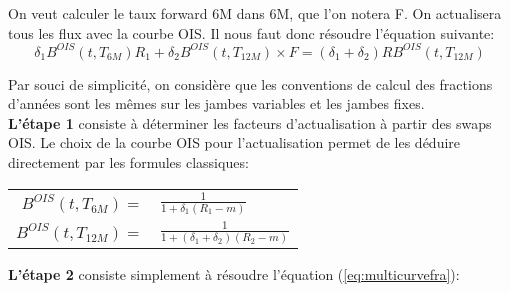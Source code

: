 \documentclass{article}
\begin{document}
On veut calculer le taux forward 6M dans 6M, que l'on notera F. On actualisera tous les flux avec la courbe OIS. Il nous faut donc résoudre l'équation suivante:\\
\begin{equation}
\label{eq:multicurvefra}
\delta_1 B^{OIS}(t,T_{6M}) R_1 + \delta_2 B^{OIS}(t,T_{12M}) \times F = (\delta_1 + \delta_2) R B^{OIS}(t,T_{12M})
\end{equation}

Par souci de simplicité, on considère que les conventions de calcul des fractions d'années sont les mêmes sur les jambes variables et les jambes fixes.\\

\textbf{L'étape 1} consiste à déterminer les facteurs d'actualisation à partir des swaps OIS. Le choix de la courbe OIS pour l'actualisation permet de les déduire directement par les formules classiques: 

\begin{center}
\begin{tabular}{r l}
$B^{OIS}(t,T_{6M})=$ & $\frac{1}{1+\delta_1 (R_1-m)}$ \\
$B^{OIS}(t,T_{12M})=$ & $\frac{1}{1+(\delta_1 + \delta_2) (R_2-m)}$ \\
\end{tabular}
\end{center}

\textbf{L'étape 2} consiste simplement à résoudre l'équation (\ref{eq:multicurvefra}):\\
\end{document}
